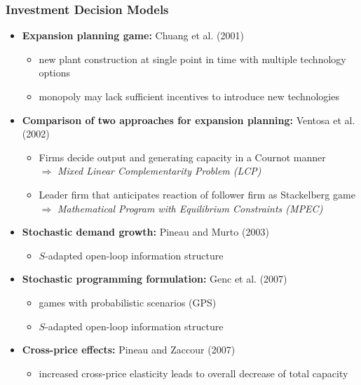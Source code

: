 \begin{frame}
\frametitle{Investment Decision Models}
\begin{itemize}
         \item \textcolor{craneblue}{\textbf{Expansion planning game:}} Chuang et al. (2001)\\
         \begin{itemize}
         		\item new plant construction at single point in time with multiple technology options
		\item monopoly may lack sufficient incentives to introduce new technologies
	\end{itemize}         
                  \item \textcolor{craneblue}{\textbf{Comparison of two approaches for expansion planning:}} Ventosa et al. (2002)\\
         \begin{itemize}
         		\item Firms decide output and generating capacity in a Cournot manner\\ 
		$\Rightarrow$ \emph{Mixed Linear Complementarity Problem (LCP)}
		\item Leader firm that anticipates reaction of follower firm as Stackelberg game\\
		$\Rightarrow$ \emph{Mathematical Program with Equilibrium Constraints (MPEC)}
	\end{itemize}  
         \item \textcolor{craneblue}{\textbf{Stochastic demand growth:}} Pineau and Murto (2003)\\
         \begin{itemize}
         		\item $S$-adapted open-loop information structure
	\end{itemize}
	\item \textcolor{craneblue}{\textbf{Stochastic programming formulation:}} Genc et al. (2007)
         \begin{itemize}
         		\item games with probabilistic scenarios (GPS)
		\item  $S$-adapted open-loop information structure
	\end{itemize}	
	\item \textcolor{craneblue}{\textbf{Cross-price effects:}} Pineau and Zaccour (2007)
         \begin{itemize}
         		\item increased cross-price elasticity leads to overall decrease of total capacity
	\end{itemize}	
\end{itemize}

\end{frame}
